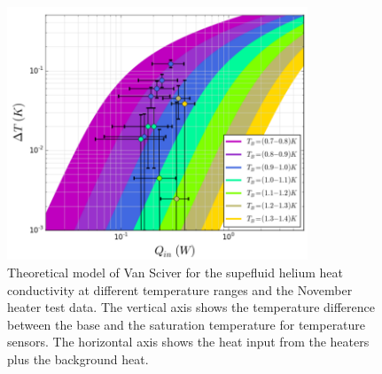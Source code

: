\begin{figure}[h!]
  \centering \includegraphics[width=0.8\textwidth]{November_Data.png}
  \caption{Theoretical model of Van Sciver for the supefluid helium
    heat conductivity at different temperature ranges and the November
    heater test data. The vertical axis shows the temperature
    difference between the base and the saturation temperature for
    temperature sensors. The horizontal axis shows the heat input from
    the heaters plus the background heat.}
\label{fig:November_Data}
\end{figure}
